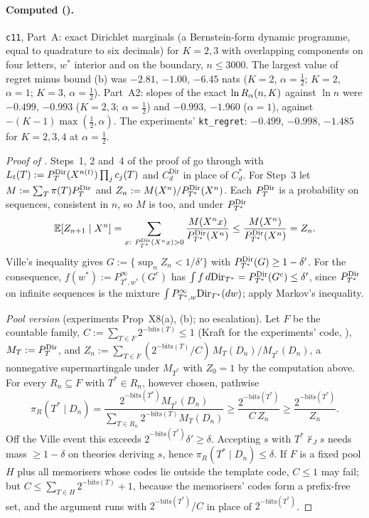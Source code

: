 \paragraph{Computed ().} \texttt{c11}, Part~A: exact Dirichlet marginals (a Bernstein-form dynamic programme, equal to quadrature to six decimals) for $K=2,3$ with overlapping components on four letters, $w^*$ interior and on the boundary, $n\le3000$. The largest value of regret minus bound (b) was $-2.81$, $-1.00$, $-6.45$ nats ($K=2$, $\alpha=\tfrac12$; $K=2$, $\alpha=1$; $K=3$, $\alpha=\tfrac12$). Part~A2: slopes of the exact $\ln R_{\alpha}(n,K)$ against $\ln n$ were $-0.499$, $-0.993$ ($K=2,3$; $\alpha=\tfrac12$) and $-0.993$, $-1.960$ ($\alpha=1$), against $-(K-1)\max(\tfrac12,\alpha)$. The experiments' \texttt{kt\_regret}: $-0.499$, $-0.998$, $-1.485$ for $K=2,3,4$ at $\alpha=\tfrac12$.

\begin{proof}[Proof of ]
Steps~1, 2 and~4 of the proof of  go through with $L_t(T):=P^{\mathrm{Dir}}_{T}(X^{n(t)})\prod_jc_j(T)$ and $C^{\mathrm{Dir}}_d$ in place of $C^*_d$. For Step~3 let $M:=\sum_T\pi(T)P^{\mathrm{Dir}}_{T}$ and $Z_n:=M(X^n)/P^{\mathrm{Dir}}_{T^*}(X^n)$. Each $P^{\mathrm{Dir}}_{T}$ is a probability on sequences, consistent in $n$, so $M$ is too, and under $P^{\mathrm{Dir}}_{T^*}$
\[
\Ex[Z_{n+1}\mid X^n]=\sum_{x:\ \PDir{T^*}(X^nx)>0}\frac{M(X^nx)}{\PDir{T^*}(X^n)}\le\frac{M(X^n)}{\PDir{T^*}(X^n)}=Z_n .
\]
Ville's inequality gives $G:=\{\sup_nZ_n<1/\delta'\}$ with $P^{\mathrm{Dir}}_{T^*}(G)\ge1-\delta'$. For the consequence, $f(w^*):=P^\infty_{T^*,w^*}(G^c)$ has $\int f\,d\mathrm{Dir}_{T^*}=P^{\mathrm{Dir}}_{T^*}(G^c)\le\delta'$, since $P^{\mathrm{Dir}}_{T^*}$ on infinite sequences is the mixture $\int P^\infty_{T^*,w}\mathrm{Dir}_{T^*}(dw)$; apply Markov's inequality.

\emph{Pool version} (experiments Prop~X8(a), (b); no escalation). Let $F$ be the countable family, $C:=\sum_{T\in F}2^{-\mathrm{bits}(T)}\le1$ (Kraft for the experiments' code, ), $M_T:=P^{\mathrm{Dir}}_{T}$, and $Z_n:=\sum_{T\in F}(2^{-\mathrm{bits}(T)}/C)\,M_T(D_n)/M_{T^*}(D_n)$, a nonnegative supermartingale under $M_{T^*}$ with $Z_0=1$ by the computation above. For every $R_n\subseteq F$ with $T^*\in R_n$, however chosen, pathwise
\[
\pi_R(T^*\mid D_n)=\frac{2^{-\mathrm{bits}(T^*)}M_{T^*}(D_n)}{\sum_{T\in R_n}2^{-\mathrm{bits}(T)}M_T(D_n)}\ge\frac{2^{-\mathrm{bits}(T^*)}}{C\,Z_n}\ge\frac{2^{-\mathrm{bits}(T^*)}}{Z_n}.
\]
Off the Ville event this exceeds $2^{-\mathrm{bits}(T^*)}\delta'\ge\delta$. Accepting $s$ with $T^*\nvdash_Js$ needs mass $\ge1-\delta$ on theories deriving $s$, hence $\pi_R(T^*\mid D_n)\le\delta$. If $F$ is a fixed pool $H$ plus all memorisers whose codes lie outside the template code, $C\le1$ may fail; but $C\le\sum_{T\in H}2^{-\mathrm{bits}(T)}+1$, because the memorisers' codes form a prefix-free set, and the argument runs with $2^{-\mathrm{bits}(T^*)}/C$ in place of $2^{-\mathrm{bits}(T^*)}$.
\end{proof}

